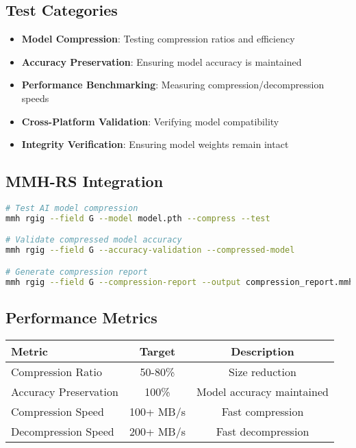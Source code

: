 \documentclass[12pt,a4paper]{article}
\begin{document}
\subsection{Test Categories}
\begin{itemize}
    \item \textbf{Model Compression}: Testing compression ratios and efficiency
    \item \textbf{Accuracy Preservation}: Ensuring model accuracy is maintained
    \item \textbf{Performance Benchmarking}: Measuring compression/decompression speeds
    \item \textbf{Cross-Platform Validation}: Verifying model compatibility
    \item \textbf{Integrity Verification}: Ensuring model weights remain intact
\end{itemize}

\subsection{MMH-RS Integration}
\begin{lstlisting}[language=bash, caption=Field G Testing with MMH-RS]
# Test AI model compression
mmh rgig --field G --model model.pth --compress --test

# Validate compressed model accuracy
mmh rgig --field G --accuracy-validation --compressed-model

# Generate compression report
mmh rgig --field G --compression-report --output compression_report.mmh
\end{lstlisting}

\subsection{Performance Metrics}
\begin{center}
\begin{tabular}{|l|c|c|}
\hline
\textbf{Metric} & \textbf{Target} & \textbf{Description} \\
\hline
Compression Ratio & 50-80\% & Size reduction \\
Accuracy Preservation & 100\% & Model accuracy maintained \\
Compression Speed & 100+ MB/s & Fast compression \\
Decompression Speed & 200+ MB/s & Fast decompression \\
\hline
\end{tabular}
\end{center}
\end{document}
